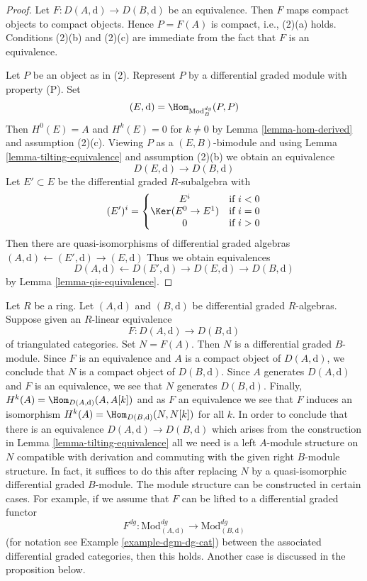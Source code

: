 \begin{proof}
Let $F : D(A, \text{d}) \to D(B, \text{d})$ be an equivalence.
Then $F$ maps compact objects to compact objects. Hence $P = F(A)$ is
compact, i.e., (2)(a) holds. Conditions (2)(b) and (2)(c) are immediate
from the fact that $F$ is an equivalence.

\medskip\noindent
Let $P$ be an object as in (2). Represent $P$ by a
differential graded module with property (P). Set
$$
(E, \text{d}) = \Hom_{\text{Mod}^{dg}_B}(P, P)
$$
Then $H^0(E) = A$ and $H^k(E) = 0$ for $k \not = 0$ by
Lemma \ref{lemma-hom-derived} and assumption (2)(c).
Viewing $P$ as a $(E, B)$-bimodule and using
Lemma \ref{lemma-tilting-equivalence} and assumption (2)(b)
we obtain an equivalence
$$
D(E, \text{d}) \to D(B, \text{d})
$$
Let $E' \subset E$ be the differential graded $R$-subalgebra
with
$$
(E')^i = \left\{
\begin{matrix}
E^i & \text{if }i < 0 \\
\Ker(E^0 \to E^1) & \text{if }i = 0 \\
0 & \text{if }i > 0
\end{matrix}
\right.
$$
Then there are quasi-isomorphisms of differential graded
algebras $(A, \text{d}) \leftarrow (E', \text{d}) \rightarrow (E, \text{d})$
Thus we obtain equivalences
$$
D(A, \text{d}) \leftarrow D(E', \text{d}) \rightarrow D(E, \text{d})
\rightarrow D(B, \text{d})
$$
by Lemma \ref{lemma-qis-equivalence}.
\end{proof}

\begin{remark}
\label{remark-lift-equivalence-to-dga}
Let $R$ be a ring. Let $(A, \text{d})$ and $(B, \text{d})$ be differential
graded $R$-algebras. Suppose given an $R$-linear equivalence
$$
F : D(A, \text{d}) \longrightarrow D(B, \text{d})
$$
of triangulated categories. Set $N = F(A)$. Then $N$ is a differential
graded $B$-module. Since $F$ is an equivalence and $A$ is a compact
object of $D(A, \text{d})$, we conclude that $N$ is a compact object
of $D(B, \text{d})$. Since $A$ generates $D(A, \text{d})$ and
$F$ is an equivalence, we see that $N$ generates $D(B, \text{d})$.
Finally, $H^k(A) = \Hom_{D(A, \text{d})}(A, A[k])$ and as $F$ an equivalence
we see that $F$ induces an isomorphism
$H^k(A) = \Hom_{D(B, \text{d})}(N, N[k])$ for all $k$.
In order to conclude that there is an equivalence
$D(A, \text{d}) \longrightarrow D(B, \text{d})$ which
arises from the construction in
Lemma \ref{lemma-tilting-equivalence}
all we need is a left $A$-module structure on $N$
compatible with derivation and commuting
with the given right $B$-module structure. In fact, it
suffices to do this after replacing $N$ by a quasi-isomorphic
differential graded $B$-module.
The module structure can be constructed in certain cases.
For example, if we assume that $F$ can be lifted to a
differential graded functor
$$
F^{dg} :
\text{Mod}^{dg}_{(A, \text{d})}
\longrightarrow
\text{Mod}^{dg}_{(B, \text{d})}
$$
(for notation see Example \ref{example-dgm-dg-cat})
between the associated differential graded categories,
then this holds. Another case is discussed in the proposition below.
\end{remark}

